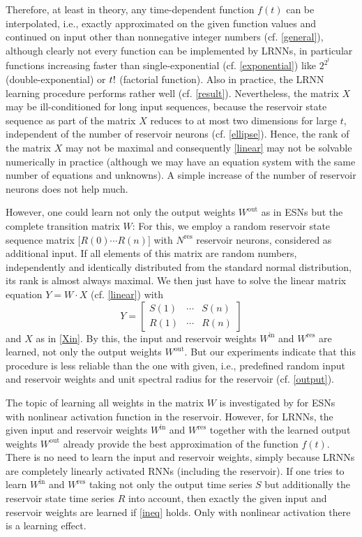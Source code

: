 \documentclass[twoside,11pt]{article}
\theoremstyle{definition}
\begin{document}
Therefore, at least in theory, any time-dependent function $f(t)$ can be
interpolated, i.e., exactly approximated on the given function values and
continued on input other than nonnegative integer numbers (cf. \cref{general}),
although clearly not every function can be implemented by LRNNs, in particular
functions increasing faster than single-exponential (cf. \cref{exponential})
like $2^{2^t}$ (double-exponential) or $t\/!$ (factorial function). Also in
practice, the LRNN learning procedure performs rather well (cf. \cref{result}).
Nevertheless, the matrix $X$ may be ill-conditioned for long input sequences, because the reservoir state
sequence as part of the matrix $X$ reduces to at most two dimensions for large
$t$, independent of the number of reservoir neurons (cf. \cref{ellipse}). Hence,
the rank of the matrix $X$ may not be maximal and consequently \cref{linear} may not
be solvable numerically in practice (although we may have an equation system with
the same number of equations and unknowns). A simple increase of the number of
reservoir neurons does not help much.

However, one could learn not only the output weights $W^\mathrm{out}$ as in ESNs
but the complete transition matrix $W$: For this, we employ a random reservoir
state sequence matrix $\big[R(0) \cdots R(n) \big]$ with $N^\mathrm{res}$
reservoir neurons, considered as additional input. If all elements of this
matrix are random numbers, independently and identically distributed from the
standard normal distribution, its rank is almost always maximal. We then just
have to solve the linear matrix equation $Y = W \cdot X$ (cf. \cref{linear})
with
\[ Y = \left[ \begin{array}{ccc}
	S(1) & \cdots & S(n)\\
	R(1) & \cdots & R(n)
\end{array} \right] \]
and $X$ as in \cref{Xin}. By this, the input and reservoir weights
$W^\mathrm{in}$ and $W^\mathrm{res}$ are learned, not only the output weights
$W^\mathrm{out}$. But our experiments indicate that this procedure is less
reliable than the one with given, i.e., predefined random input and reservoir
weights and unit spectral radius for the reservoir (cf. \cref{output}).

The topic of learning all weights in the matrix $W$ is investigated
by \citet{PDW13} for ESNs with nonlinear activation function in the reservoir.
However, for LRNNs, the given input and reservoir weights $W^\mathrm{in}$ and
$W^\mathrm{res}$ together with the learned output weights $W^\mathrm{out}$
already provide the best approximation of the function $f(t)$. There is no need
to learn the input and reservoir weights, simply because LRNNs are completely
linearly activated RNNs (including the reservoir). If one tries to learn
$W^\mathrm{in}$ and $W^\mathrm{res}$ taking not only the output time series $S$
but additionally the reservoir state time series $R$ into account, then exactly
the given input and reservoir weights are learned if \cref{ineq} holds. Only
with nonlinear activation there is a learning effect.
\end{document}
